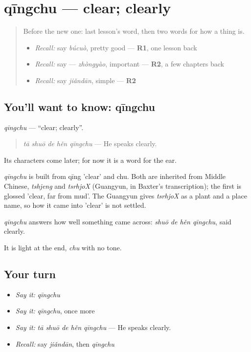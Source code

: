 \section[qīngchu]{qīngchu — clear; clearly}

\label{lesson:ZH-C152-qingchu}



\begin{quote}
Before the new one: last lesson's word, then two words for how a thing is.

\begin{itemize}
\raggedright
  \item \emph{Recall:} say \emph{búcuò}, pretty good — \textbf{R1}, one lesson back
  \item \emph{Recall:} say  — \emph{zhòngyào}, important — \textbf{R2}, a few chapters back
  \item \emph{Recall:} say \emph{jiǎndān}, simple — \textbf{R2}
\end{itemize}
\end{quote}

\subsection*{You'll want to know: qīngchu}
\emph{qīngchu} — \textquotedblleft{}clear; clearly\textquotedblright{}.

\begin{quote}
\emph{tā shuō de hěn qīngchu} — He speaks clearly.
\end{quote}

Its characters come later; for now it is a word for the ear.

\begin{cousinweb}
\emph{qīngchu} is built from qīng 'clear' and chu. Both are inherited from Middle Chinese, \emph{tshjeng} and \emph{tsrhjoX} (Guangyun, in Baxter's transcription); the first is glossed 'clear, far from mud'. The Guangyun gives \emph{tsrhjoX} as a plant and a place name, so how it came into 'clear' is not settled.
\end{cousinweb}

\begin{grammarlens}[title={What you've built}]
\emph{qīngchu} answers how well something came across: \emph{shuō de hěn qīngchu}, said clearly.

It is light at the end, \emph{chu} with no tone.
\end{grammarlens}

\subsection*{Your turn}
\begin{itemize}
\raggedright
  \item \emph{Say it:} \emph{qīngchu}
  \item \emph{Say it:} \emph{qīngchu}, once more
  \item \emph{Say it:} \emph{tā shuō de hěn qīngchu} — He speaks clearly.
  \item \emph{Recall:} say \emph{jiǎndān}, then \emph{qīngchu}
\end{itemize}

